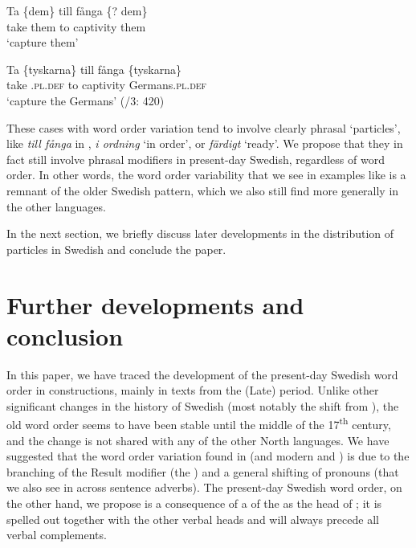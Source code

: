 \documentclass[output=paper]{langscibook}
\begin{document}
\ea\label{ex:lalu:63}
\ea
\gll Ta   \{dem\}   till   fånga       \{? dem\}\\
    take   them     to     captivity    {}   them\\
\glt `capture them'

\ex
\gll Ta   \{tyskarna\}       till   fånga     \{tyskarna\}\\
 take   \textsc{.pl.def}   to     captivity     Germans\textsc{.pl.def}\\
\glt `capture the Germans’ (\citealt{TelemanEtAl1999}/3: 420)\\
\z
\z


These cases with word order variation tend to involve clearly phrasal ‘particles’, like \textit{till fånga} in , \textit{i ordning} ‘in order’, or \textit{färdigt} ‘ready’. We propose that they in fact still involve phrasal modifiers in present-day Swedish, regardless of word order. In other words, the word order variability that we see in examples like  is a remnant of the older Swedish pattern, which we also still find more generally in the other  languages.



In the next section, we briefly discuss later developments in the distribution of particles in Swedish and conclude the paper.


\section{Further developments and conclusion}\label{sec:lalu:7}
In this paper, we have traced the development of the present-day Swedish word order in  constructions, mainly in texts from the (Late)  period. Unlike other significant changes in the history of Swedish (most notably the shift from ), the old word order seems to have been stable until the middle of the 17\textsuperscript{th} century, and the change is not shared with any of the other North  languages. We have suggested that the word order variation found in  (and modern  and ) is due to the branching of the Result modifier (the ) and a general shifting of pronouns (that we also see in  across sentence adverbs). The present-day Swedish word order, on the other hand, we propose is a consequence of a  of the  as the head of ; it is spelled out together with the other verbal heads and will always precede all verbal complements. 
\end{document}

